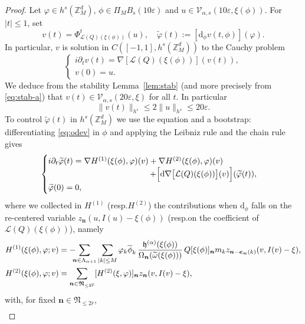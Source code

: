 \documentclass[10pt,a4paper]{amsart}
\providecommand{\resp}{resp.}
\theoremstyle{plain}
\theoremstyle{definition}
\newcommand{\nb}{{\boldsymbol n}}
\newcommand{\Nb}{{\boldsymbol{\mathfrak{N}}}}
\newcommand{\Z}{\mathbb{Z}}
\newcommand{\1}{\mathbf{1}}
\let\epsilon\varepsilon
\begin{document}
\begin{proof}
Let $\varphi\in h^{s}(\Z_{M}^{d})$, $\phi\in\Pi_{M}B_{s}(10\epsilon)$ and $u\in\mathcal{V}_{\alpha,s}(10\epsilon,\xi(\phi))$. For $|t|\leq 1$, set
\[
v(t) = \Phi^{t}_{\mathcal{L}(Q)(\xi(\phi))}(u),\quad \widetilde{\varphi}(t) := [\mathrm{d}_{\phi}v(t,\phi)](\varphi).
\]
In particular, $v$ is solution in $C([-1,1],h^{s}(\Z_{M}^{d}))$ to the Cauchy problem
\[
\begin{cases}
i\partial_{t}v(t) = \nabla [\mathcal{L}(Q)(\xi(\phi))](v(t)),\\
v(0)=u.
\end{cases}
\]
We deduce from the stability Lemma~\ref{lem:stab} (and more precisely from \eqref{eq:stab-a}) that $v(t)\in\mathcal{V}_{\alpha,s}(20\epsilon,\xi)$ for all $t$. In particular
\[
\|v(t)\|_{h^{s}}\leq 2\|u\|_{h^{s}}\leq20\epsilon.
\]
To control $\widetilde{\varphi}(t)$ in $h^{s}(\Z_{M}^{d})$ we use the equation and a bootstrap: differentiating \eqref{eq:odev} in $\phi$ and applying the Leibniz rule and the chain rule gives
\begin{equation}
\label{eq:dim}
\begin{cases}
i\partial_{t}\widetilde{\varphi}(t)
= \nabla H^{(1)}(\xi(\phi),\varphi)(v) + \nabla H^{(2)}(\xi(\phi),\varphi)(v)\\
\hspace*{4.35cm}+ \Big[\mathrm{d}\nabla\big[\mathcal{L}(Q)(\xi(\phi))\big](v)\Big](\widetilde{\varphi}(t)),\\
\widetilde{\varphi}(0)=0,
\end{cases}
\end{equation}
where we collected in $H^{(1)}$ (\resp $H^{(2)}$) the contributions when $\mathrm{d}_{\phi}$ falls on the re-centered variable $z_{\nb}(u,I(u)-\xi(\phi))$ (\resp on the coefficient of $\mathcal{L}(Q)(\xi(\phi))$), namely
\begin{align*}
H^{(1)}(\xi(\phi),\varphi;v)
&= -\hspace*{-2mm}\sum_{\nb\in\Lambda_{\alpha+1}}\sum_{|k|\leq M}\varphi_{k}\overline{\phi}_{k}\,
\frac{\mathfrak{h}^{(\alpha)}(\xi(\phi))}{\Omega_{\nb}(\widetilde{\omega}(\xi(\phi)))}\,
Q[\xi(\phi)]_{\nb}
m_{k}z_{\nb-\boldsymbol{e}_{\mathfrak{m}}(k)}(v,I(v)-\xi),\\
H^{(2)}(\xi(\phi),\varphi ; v)
&= \sum_{\nb\in\Nb_{\leq2\overline{r}}}
[H^{(2)}(\xi,\varphi)]_{\nb}z_{\nb}(v,I(v)-\xi),
\end{align*}
with, for fixed $\nb\in\Nb_{\leq2\overline{r}}$,
\begin{equation*}
\begin{split}

\end{split}
\end{equation*}
\end{proof}
\end{document}
